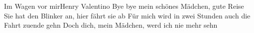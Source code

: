 \begin{song}{Im Wagen vor mir}{Henry Valentino}{}
Bye bye mein schönes Mädchen, gute Reise
Sie hat den Blinker an, hier fährt sie ab
Für mich wird in zwei Stunden auch die Fahrt zuende gehn
Doch dich, mein Mädchen, werd ich nie mehr sehn

 

\end{song}

